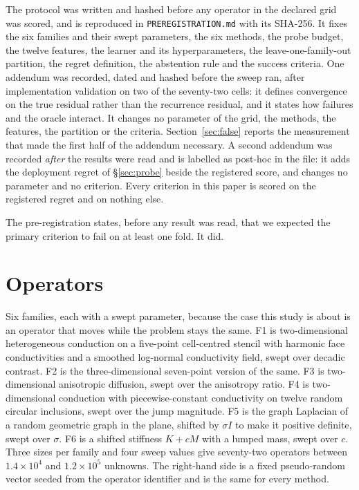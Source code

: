 \documentclass[11pt]{article}
\begin{document}
The protocol was written and hashed before any operator in the declared grid was
scored, and is reproduced in \texttt{PREREGISTRATION.md} with its SHA-256. It
fixes the six families and their swept parameters, the six methods, the probe
budget, the twelve features, the learner and its hyperparameters, the
leave-one-family-out partition, the regret definition, the abstention rule and
the success criteria. One addendum was recorded, dated and hashed before the
sweep ran, after implementation validation on two of the seventy-two cells: it
defines convergence on the true residual rather than the recurrence residual, and
it states how failures and the oracle interact. It changes no parameter of the
grid, the methods, the features, the partition or the criteria. Section~\ref{sec:false}
reports the measurement that made the first half of the addendum necessary. A
second addendum was recorded \emph{after} the results were read and is labelled
as post-hoc in the file: it adds the deployment regret of \S\ref{sec:probe}
beside the registered score, and changes no parameter and no criterion. Every
criterion in this paper is scored on the registered regret and on nothing else.

The pre-registration states, before any result was read, that we expected the
primary criterion to fail on at least one fold. It did.

\section{Operators}

Six families, each with a swept parameter, because the case this study is about
is an operator that moves while the problem stays the same. F1 is
two-dimensional heterogeneous conduction on a five-point cell-centred stencil
with harmonic face conductivities and a smoothed log-normal conductivity field,
swept over decadic contrast. F2 is the three-dimensional seven-point version of
the same. F3 is two-dimensional anisotropic diffusion, swept over the anisotropy
ratio. F4 is two-dimensional conduction with piecewise-constant conductivity on
twelve random circular inclusions, swept over the jump magnitude. F5 is the graph
Laplacian of a random geometric graph in the plane, shifted by $\sigma I$ to make
it positive definite, swept over $\sigma$. F6 is a shifted stiffness $K + cM$
with a lumped mass, swept over $c$. Three sizes per family and four sweep values
give seventy-two operators between $1.4\times10^{4}$ and $1.2\times10^{5}$
unknowns. The right-hand side is a fixed pseudo-random vector seeded from the
operator identifier and is the same for every method.
\end{document}
